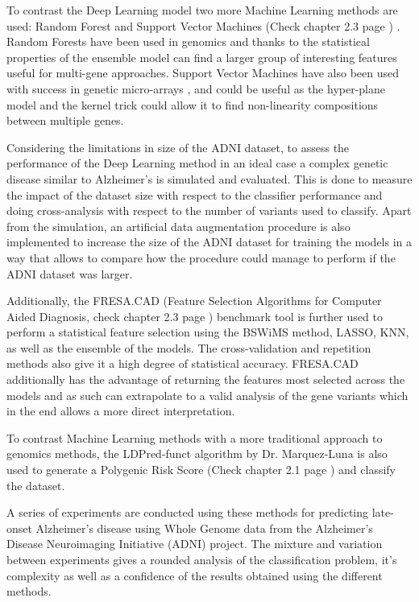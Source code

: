 To contrast the Deep Learning model two more Machine Learning methods are used: Random Forest and Support Vector Machines (Check chapter 2.3 page \pageref{RF}) . Random Forests have been used in genomics \cite{CHEN2012323} and thanks to the statistical properties of the ensemble model can find a larger group of interesting features useful for multi-gene approaches. Support Vector Machines have also been used with success in genetic micro-arrays \cite{peng2003molecular}, and could be useful as the hyper-plane model and the kernel trick could allow it to find non-linearity compositions between multiple genes.

Considering the limitations in size of the ADNI dataset, to assess the performance of the Deep Learning method in an ideal case a complex genetic disease similar to Alzheimer's is simulated and evaluated. This is done to measure the impact of the dataset size with respect to the classifier performance and doing cross-analysis with respect to the number of variants used to classify. Apart from the simulation, an artificial data augmentation procedure is also implemented to increase the size of the ADNI dataset for training the models in a way that allows to compare how the procedure could manage to perform if the ADNI dataset was larger.

Additionally, the FRESA.CAD (Feature Selection Algorithms for Computer Aided Diagnosis, check chapter 2.3 page \pageref{fresaCAD}) \cite{fresa} benchmark tool is further used to perform a statistical feature selection using the BSWiMS method, LASSO, KNN, as well as the ensemble of the models. The cross-validation and repetition methods also give it a high degree of statistical accuracy. FRESA.CAD additionally has the advantage of returning the features most selected across the models and as such can extrapolate to a valid analysis of the gene variants which in the end allows a more direct interpretation.

To contrast Machine Learning methods with a more traditional approach to genomics methods, the LDPred-funct algorithm by Dr. Marquez-Luna \cite{Marquez-Luna375337} is also used to generate a Polygenic Risk Score (Check chapter 2.1 page \pageref{PRS})  and classify the dataset.

A series of experiments are conducted using these methods for predicting late-onset Alzheimer's disease using Whole Genome data from the Alzheimer's Disease Neuroimaging Initiative (ADNI) project. The mixture and variation between experiments gives a rounded analysis of the classification problem, it's complexity as well as a confidence of the results obtained using the different methods.


